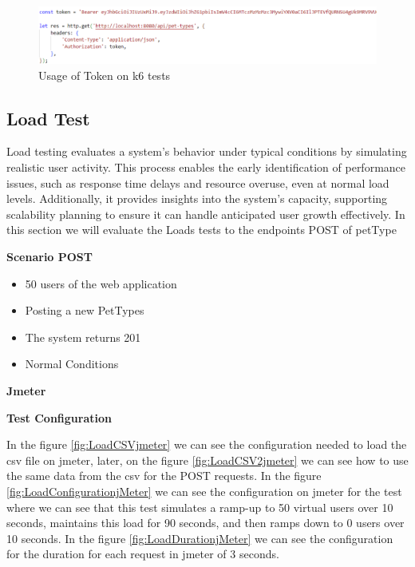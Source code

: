 \documentclass[a4paper,11pt,openright,BCOR=15mm]{scrbook}
\begin{document}
\begin{figure}[H]
	\centering
	\includegraphics[width=\textwidth]{figs/Performance/Authenticationk6.png}
	\caption{Usage of Token on k6 tests}
	\label{fig:Authenticationk6}
\end{figure}

\subsection{Load Test}

Load testing evaluates a system's behavior under typical conditions by simulating realistic user activity. This process enables the early identification of performance issues, such as response time delays and resource overuse, even at normal load levels. Additionally, it provides insights into the system’s capacity, supporting scalability planning to ensure it can handle anticipated user growth effectively.
In this section we will evaluate the Loads tests to the endpoints POST of petType

\textbf{Scenario POST}

\begin{itemize}
	\item 50 users of the web application
	\item Posting a new PetTypes
	\item The system returns 201
	\item Normal Conditions
\end{itemize}

\textbf{Jmeter}




\textbf{Test Configuration}



In the figure \ref{fig:LoadCSVjmeter} we can see the configuration needed to load the csv file on jmeter, later, on the figure \ref{fig:LoadCSV2jmeter} we can see how to use the same data from the csv for the POST requests. In the figure \ref{fig:LoadConfigurationjMeter} we can see the configuration on jmeter for the test where we
can see that this test simulates a ramp-up to 50 virtual users over 10 seconds, maintains
this load for 90 seconds, and then ramps down to 0 users over 10 seconds. In the figure \ref{fig:LoadDurationjMeter} we can see the configuration for the duration for each request in jmeter of 3 seconds.
\end{document}
